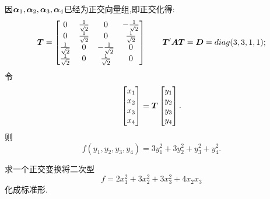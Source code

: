 \documentclass[lang=cn,11pt,normal]{elegantbook}
\begin{document}
\begin{solution}
\begin{equation}
		\end{equation}
		因$\boldsymbol{\alpha}_1,\boldsymbol{\alpha}_2,\boldsymbol{\alpha}_3,\boldsymbol{\alpha}_4$已经为正交向量组,即正交化得:
		\begin{equation}
		\boldsymbol{T}=
		\begin{bmatrix}
		0&\frac{1}{\sqrt{2}}&0&-\frac{1}{\sqrt{2}}\\
		0&\frac{1}{\sqrt{2}}&0&\frac{1}{\sqrt{2}}\\
		\frac{1}{\sqrt{2}}&0&-\frac{1}{\sqrt{2}}&0\\
		\frac{1}{\sqrt{2}}&0&\frac{1}{\sqrt{2}}&0
		\end{bmatrix}
		\qquad\boldsymbol{T}'\boldsymbol{A}\boldsymbol{T}=\boldsymbol{D}=diag(3,3,1,1);
		\end{equation}
		令
		\begin{equation}
		\begin{bmatrix}
		x_1\\x_2\\x_3\\x_4
		\end{bmatrix}
		=
		\boldsymbol{T}
		\begin{bmatrix}
		y_1\\y_2\\y_3\\y_4
		\end{bmatrix}.
		\end{equation}
		则
		\begin{equation}
		f(y_1,y_2,y_3,y_4)=3y_1^2+3y_2^2+y_3^2+y_4^2.
		\end{equation}
	\end{solution}
	\begin{exercise}
		求一个正交变换将二次型
		\begin{equation}
		f=2x_1^2+3x_2^2+3x_3^2+4x_2x_3
		\end{equation}
		化成标准形.
	\end{exercise}
\end{document}
